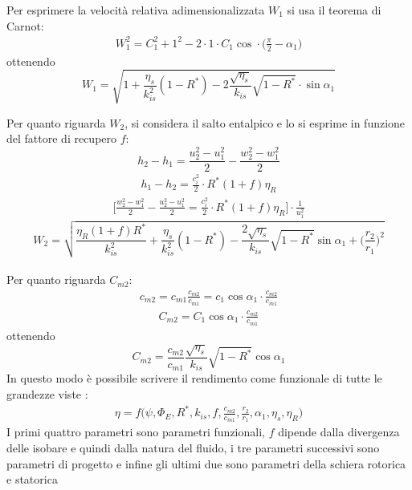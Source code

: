 Per esprimere la velocità relativa adimensionalizzata $W_1$ si usa il teorema di Carnot:
\begin{align*}
W_1^2 = C_1^2 + 1^2 - 2 \cdot 1 \cdot C_1 \cos \cdot \big( \frac{\pi}{2} - \alpha_1 \big)
\end{align*}
ottenendo
\begin{equation}
\boxed{ W_1 = \sqrt{1 + \frac{\eta_{s}}{k_{is}^2} \left( 1 - R^* \right) - 2 \frac{\sqrt{\eta_s}}{k_{is}} \sqrt{1-R^*} \cdot \sin \alpha_1}}
\label{eq:W1}
\end{equation}

Per quanto riguarda $W_2$, si considera il salto entalpico e lo si esprime in funzione del fattore di recupero $f$:
\begin{equation}
h_2 - h_1 = \frac{u_2^2 - u_1^2}{2} - \frac{w_2^2 - w_1^2}{2}
\end{equation}
\begin{align*}
h_1 - h_2 = \frac{c_i^2}{2} \cdot R^* \left( 1 + f \right) \eta_R
\end{align*}
\begin{align*}
\Bigg[\frac{w_2^2 - w_1^2}{2} - \frac{u_2^2 - u_1^2}{2} = \frac{c_i^2}{2} \cdot R^* \left( 1 + f \right) \eta_R \Bigg] \cdot \frac{1}{u_1^2}
\end{align*}
\begin{equation}
\boxed{W_2 = \sqrt{\frac{\eta_R \left( 1 + f \right) R^*}{k_{is}^2} + \frac{\eta_s}{k_{is}^2}  \left(1 - R^* \right) - \frac{2 \sqrt{\eta_s}}{k_{is}} \sqrt{1 - R^*} \sin \alpha_1 + \bigg(\frac{r_2}{r_1} \bigg)^2 } }
\end{equation}
\\Per quanto riguarda $C_{m2}$:
\begin{align*}
c_{m2} = c_{m1} \frac{c_{m2}}{c_{m1}}=c_1 \cos \alpha_1 \cdot \frac{c_{m2}}{c_{m1}}
\end{align*}
\begin{align*}
C_{m2} = C_1 \cos \alpha_1 \cdot \frac{c_{m2}}{c_{m1}}
\end{align*}
ottenendo
\begin{equation}
\boxed{C_{m2} = \frac{c_{m2}}{c_{m1}} \frac{\sqrt{\eta_s}}{k_{is}} \sqrt{1 - R^*} \cos \alpha_1 }
\end{equation}
In questo modo è possibile scrivere il rendimento come funzionale di tutte le grandezze viste :
\begin{align*}
\boxed{\eta = f \bigg( \psi, \Phi_E, R^*, k_{is}, f, \frac{c_{m2}}{c_{m1}}, \frac{r_2}{r_1}, \alpha_1, \eta_s, \eta_R \bigg)}
\end{align*}
I primi quattro parametri sono parametri funzionali, $f$ dipende dalla divergenza delle isobare e quindi dalla natura del fluido, i tre parametri successivi sono parametri di progetto e infine gli ultimi due sono parametri della schiera rotorica e statorica

